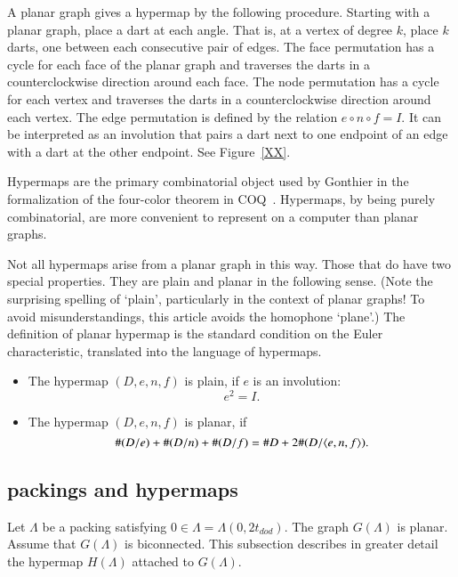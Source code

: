 A planar graph gives  a hypermap
by the following procedure.  Starting with a planar graph,
place a dart at each angle.  That is, at a vertex of degree $k$,
place $k$ darts, one between each consecutive pair of edges.
The face permutation has a cycle for
each face of the planar graph and  traverses the
darts in a counterclockwise direction around each face.
The node permutation has a cycle for each vertex and traverses
the darts in a counterclockwise direction around each vertex.
The edge permutation is defined by the relation $e\circ n\circ f=I$.
It can be interpreted as an involution that pairs a dart next
to one endpoint of an edge with a dart at the other endpoint.
See Figure~\ref{XX}.

Hypermaps are the primary combinatorial object used by Gonthier
in the formalization of the four-color theorem in COQ~\cite{Gon}.
Hypermaps, by being purely combinatorial, are more convenient
to represent on a computer than planar graphs.  


Not all hypermaps arise from a planar graph in this way.
Those that do have two special properties.  They are plain
and planar in the following sense.  (Note the surprising spelling
of `plain', particularly in the context of planar graphs!  
To avoid misunderstandings, 
this article avoids the homophone `plane'.)  The definition
of planar hypermap is the standard condition on the Euler
characteristic, translated into the language of hypermaps.

\begin{definition}\label{def:plain}
\mbox{}
\begin{itemize}
\item The hypermap $(D,e,n,f)$ is plain, if $e$ is an involution:
$$
 e^2 = I.
$$
\item The hypermap $(D,e,n,f)$ is planar, if
   $$
   \#(D/e) + \#(D/n) + \#(D/f) = \# D + 2\#(D/\langle e,n,f\rangle).
   $$
\end{itemize}
\end{definition}

\subsection{packings and hypermaps}\label{sec:ph}

Let $\Lambda$ be a packing satisfying $0\in\Lambda=\Lambda(0,2t_{dod})$.  The graph
$G(\Lambda)$ is planar.   Assume that $G(\Lambda)$ is biconnected. 
This subsection describes in greater detail the
hypermap $H(\Lambda)$ attached to $G(\Lambda)$.

